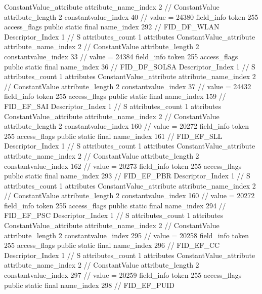 {{{{{{				ConstantValue_attribute {
					attribute_name_index	2		// ConstantValue
					attribute_length	2
					constantvalue_index	40		// value = 24380
				}
				}
			}
			field_info {
				token	255
				access_flags	public static final
				name_index	292		// FID_DF_WLAN
				Descriptor_Index	1		// S
				attributes_count	1
				attributes {
				ConstantValue_attribute {
					attribute_name_index	2		// ConstantValue
					attribute_length	2
					constantvalue_index	33		// value = 24384
				}
				}
			}
			field_info {
				token	255
				access_flags	public static final
				name_index	36		// FID_DF_SOLSA
				Descriptor_Index	1		// S
				attributes_count	1
				attributes {
				ConstantValue_attribute {
					attribute_name_index	2		// ConstantValue
					attribute_length	2
					constantvalue_index	37		// value = 24432
				}
				}
			}
			field_info {
				token	255
				access_flags	public static final
				name_index	159		// FID_EF_SAI
				Descriptor_Index	1		// S
				attributes_count	1
				attributes {
				ConstantValue_attribute {
					attribute_name_index	2		// ConstantValue
					attribute_length	2
					constantvalue_index	160		// value = 20272
				}
				}
			}
			field_info {
				token	255
				access_flags	public static final
				name_index	161		// FID_EF_SLL
				Descriptor_Index	1		// S
				attributes_count	1
				attributes {
				ConstantValue_attribute {
					attribute_name_index	2		// ConstantValue
					attribute_length	2
					constantvalue_index	162		// value = 20273
				}
				}
			}
			field_info {
				token	255
				access_flags	public static final
				name_index	293		// FID_EF_PBR
				Descriptor_Index	1		// S
				attributes_count	1
				attributes {
				ConstantValue_attribute {
					attribute_name_index	2		// ConstantValue
					attribute_length	2
					constantvalue_index	160		// value = 20272
				}
				}
			}
			field_info {
				token	255
				access_flags	public static final
				name_index	294		// FID_EF_PSC
				Descriptor_Index	1		// S
				attributes_count	1
				attributes {
				ConstantValue_attribute {
					attribute_name_index	2		// ConstantValue
					attribute_length	2
					constantvalue_index	295		// value = 20258
				}
				}
			}
			field_info {
				token	255
				access_flags	public static final
				name_index	296		// FID_EF_CC
				Descriptor_Index	1		// S
				attributes_count	1
				attributes {
				ConstantValue_attribute {
					attribute_name_index	2		// ConstantValue
					attribute_length	2
					constantvalue_index	297		// value = 20259
				}
				}
			}
			field_info {
				token	255
				access_flags	public static final
				name_index	298		// FID_EF_PUID
}}}}}
